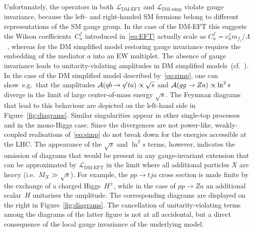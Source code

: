 \documentclass[review]{elsarticle}
\begin{document}
Unfortunately, the operators in both $\mathcal{L}_\text{DM-EFT}$ and $\mathcal{L}_\text{DM-simp}$ violate gauge invariance, because the left- and right-handed SM fermions belong to different representations of the SM gauge group. In the case of the DM-EFT this suggests the Wilson coefficients~$C_n^f$ introduced in~\eqref{eq:EFT} actually scale as $C_n^f = c_n^f m_{f_i}/\Lambda$~\cite{Bell:2015sza}, whereas for the DM simplified model restoring gauge invariance requires the embedding of the mediator $a$ into an EW multiplet. The absence of gauge invariance leads to unitarity-violating amplitudes in DM simplified models~(cf.~\cite{Bell:2015sza,Bell:2015rdw,Haisch:2016usn,Englert:2016joy,Maltoni:2001hu,Farina:2012xp}). In the case of the DM simplified model described by~\eqref{eq:simp}, one can show~e.g.~that the amplitudes ${\cal A} ( q b \to q^\prime t a) \propto \sqrt{s}$ and ${\cal A} ( g g \to Z a ) \propto \ln^2 s$ diverge in the limit of large center-of-mass energy $\sqrt{s}$. The Feynman diagrams that lead to this behaviour are depicted on the left-hand side in Figure~\ref{fig:diagrams}. Similar singularities appear in other single-top processes and in the mono-Higgs case.  Since the divergences are not power-like, weakly-coupled realisations of~\eqref{eq:simp} do not break down for the energies accessible at the LHC. The appearance of the $\sqrt{s}$ and $\ln^2 s$ terms, however, indicates the omission of diagrams that would be present in any gauge-invariant extension that can be approximated by $\mathcal{L}_\text{DM-EFT}$ in the limit where all additional particles $X$ are heavy (i.e.~$M_X \gg \sqrt{s}$).   For example, the $pp \to tj a$ cross section is made finite by the exchange of a charged Higgs~$H^\pm$, while in the case of $pp \to Za$  an additional scalar~$H$ unitarises the amplitude. The corresponding diagrams are displayed on the right in Figure~\ref{fig:diagrams}. The cancellation of unitarity-violating terms among the diagrams of the latter figure is not at all accidental, but a direct consequence of the local gauge invariance of the underlying model.
\end{document}
